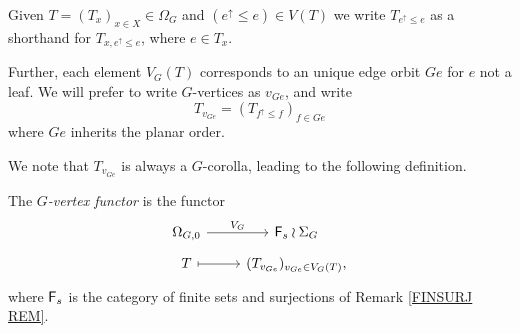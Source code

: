 \documentclass[a4paper,10pt]{article}%
\begin{document}
\begin{notation}\label{GVERT NOT}
Given $T=(T_x)_{x \in X} \in \Omega_G$
and $(e^{\uparrow} \leq e) \in V(T)$ 
we write $T_{e^{\uparrow}\leq e}$
as a shorthand for $T_{x,e^{\uparrow}\leq e}$, where $e \in T_x$.

Further, each element $V_G(T)$ corresponds to an unique edge orbit $Ge$ for $e$ not a leaf.
We will prefer to write $G$-vertices as $v_{Ge}$, and write
\begin{equation}\label{TVGE DEF}
T_{v_{Ge}} = (T_{f^{\uparrow} \leq f})_{f \in Ge}
\end{equation}
where $Ge$ inherits the planar order.
\end{notation}


We note that $T_{v_{Ge}}$ is always a $G$-corolla, leading to the following definition.

\begin{definition}
The \textit{$G$-vertex functor} is the functor
	\begin{equation}\label{VFUNCTOR EQ}
		\begin{tikzcd}[row sep=tiny]
		\Omega_{G,0} \ar{r}{V_G} & \Fin_s \wr \Sigma_G \\
		T \ar[mapsto]{r} & (T_{v_{Ge}})_{v_{Ge} \in V_G(T)},
		\end{tikzcd}	
	\end{equation}
where $\mathsf{F}_s$ is the category of finite sets and surjections of
Remark \ref{FINSURJ REM}.
\end{definition}
\end{document}
